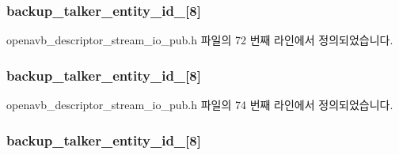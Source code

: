 \subsubsection[{\texorpdfstring{backup\+\_\+talker\+\_\+entity\+\_\+id\+\_\+0}{backup_talker_entity_id_0}}]{ backup\+\_\+talker\+\_\+entity\+\_\+id\+\_\mbox{[}8\mbox{]}}\hypertarget{structopenavb__aem__descriptor__stream__io__t_ade7e19c5c928739d25f3bd388c70e8d6}{}\label{structopenavb__aem__descriptor__stream__io__t_ade7e19c5c928739d25f3bd388c70e8d6}


openavb\+\_\+descriptor\+\_\+stream\+\_\+io\+\_\+pub.\+h 파일의 72 번째 라인에서 정의되었습니다.

\subsubsection[{\texorpdfstring{backup\+\_\+talker\+\_\+entity\+\_\+id\+\_\+1}{backup_talker_entity_id_1}}]{ backup\+\_\+talker\+\_\+entity\+\_\+id\+\_\mbox{[}8\mbox{]}}\hypertarget{structopenavb__aem__descriptor__stream__io__t_ad0dc8dfe59a782e5bdb095e8b7b720a8}{}\label{structopenavb__aem__descriptor__stream__io__t_ad0dc8dfe59a782e5bdb095e8b7b720a8}


openavb\+\_\+descriptor\+\_\+stream\+\_\+io\+\_\+pub.\+h 파일의 74 번째 라인에서 정의되었습니다.

\subsubsection[{\texorpdfstring{backup\+\_\+talker\+\_\+entity\+\_\+id\+\_\+2}{backup_talker_entity_id_2}}]{ backup\+\_\+talker\+\_\+entity\+\_\+id\+\_\mbox{[}8\mbox{]}}\hypertarget{structopenavb__aem__descriptor__stream__io__t_ac5d33240548dbad2ec9f75978a3cb4fa}{}\label{structopenavb__aem__descriptor__stream__io__t_ac5d33240548dbad2ec9f75978a3cb4fa}


